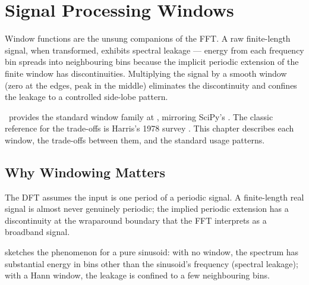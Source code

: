 \chapter{Signal Processing Windows}
\label{ch:signal_windows}

Window functions are the unsung companions of the FFT. A raw
finite-length signal, when transformed, exhibits spectral
leakage --- energy from each frequency bin spreads into
neighbouring bins because the implicit periodic extension of the
finite window has discontinuities. Multiplying the signal by a
smooth window (zero at the edges, peak in the middle) eliminates
the discontinuity and confines the leakage to a controlled
side-lobe pattern.

\Lucid\ provides the standard window family at
, mirroring SciPy's
. The classic reference for the
trade-offs is Harris's 1978 survey
\cite{harris_blackman_1978}. This chapter describes each window,
the trade-offs between them, and the standard usage patterns.

\section{Why Windowing Matters}
\label{sec:signal_windows:why}

The DFT assumes the input is one period of a periodic signal. A
finite-length real signal is almost never genuinely periodic; the
implied periodic extension has a discontinuity at the wraparound
boundary that the FFT interprets as a broadband signal.

 sketches the phenomenon for
a pure sinusoid: with no window, the spectrum has substantial
energy in bins other than the sinusoid's frequency (spectral
leakage); with a Hann window, the leakage is confined to a few
neighbouring bins.


